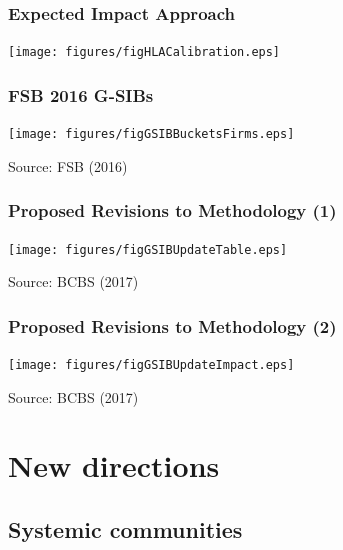 \documentclass[aspectratio=43,dvipsnames,usenames, svgnames]{beamer}
\begin{document}
\begin{frame} %
\frametitle{Expected Impact Approach}
\begin{center}
	\texttt{[image: figures/figHLACalibration.eps]}
\end{center}
\end{frame}

\begin{frame} %
\frametitle{FSB 2016 G-SIBs}
\begin{center}
	\texttt{[image: figures/figGSIBBucketsFirms.eps]}
\end{center}
\begin{flushleft}
	\tiny{Source: FSB (2016)}
\end{flushleft}
\end{frame}

\begin{frame} %
\frametitle{Proposed Revisions to Methodology (1)}
\begin{center}
	\texttt{[image: figures/figGSIBUpdateTable.eps]}
\end{center}
\begin{flushleft}
	\tiny{Source: BCBS (2017)}
\end{flushleft}
\end{frame}

\begin{frame} %
\frametitle{Proposed Revisions to Methodology (2)}
\begin{center}
	\texttt{[image: figures/figGSIBUpdateImpact.eps]}
\end{center}
\begin{flushleft}
	\tiny{Source: BCBS (2017)}
\end{flushleft}
\end{frame}

\section{New directions}

\subsection{Systemic communities}
\end{document}
